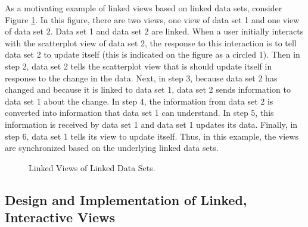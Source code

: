 \documentclass{article}[11pt]
\begin{document}
As a motivating example of linked views based on linked data sets, consider
Figure \ref{Fig:firstMP}.  In this figure, there are two views, one view of
data set 1 and one view of data set 2.  Data set 1 and data set 2 are linked.
When a user initially interacts with the scatterplot view of data set 2, the
response to this interaction is to tell data set 2 to update itself (this is
indicated on the figure as a circled 1).  Then in step 2, data set 2 tells the
scatterplot view that is should update itself in response to the change in the
data.  Next, in step 3, because data set 2 has changed and because it is
linked to data set 1, data set 2 sends information to data set 1 about the
change.  In step 4, the information from data set 2 is converted into
information that data set 1 can understand.  In step 5, this information is
received by data set 1 and data set 1 updates its data.  Finally, in step 6,
data set 1 tells its view to update itself.  Thus, in this example, the views
are synchronized based on the underlying linked data sets.

\clearpage

\begin{figure}[ht]
  \begin{center}
    \caption{ Linked Views of Linked Data Sets. }
    \label{Fig:firstMP}
  \end{center}
\end{figure}

\subsection{Design and Implementation of Linked, Interactive
  Views}\label{Ssec:Design} 
\end{document}
